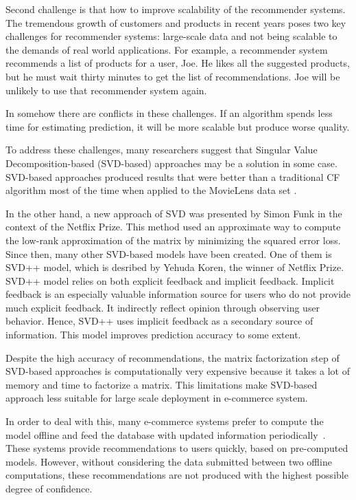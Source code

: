 \documentclass[oneside,13pt]{extreport}
\begin{document}
Second challenge is that how to improve scalability of the recommender systems. The tremendous growth of customers and products in recent years poses two key challenges for recommender systems: large-scale data and not being scalable to the demands of real world applications. For example, a recommender system recommends a list of products for a user, Joe. He likes all the suggested products, but he must wait thirty minutes to get the list of recommendations. Joe will be unlikely to use that recommender system again. 

In somehow there are conflicts in these challenges. If an algorithm spends less time for estimating prediction, it will be more scalable but produce worse quality. 

To address these challenges, many researchers suggest that Singular Value Decomposition-based (SVD-based) approaches may be a solution in some case. SVD-based approaches produced results that were better than a traditional CF algorithm most of the time when applied to the MovieLens data set \cite{SarwarApplication}. 

In the other hand, a new approach of SVD was presented by Simon Funk in the context of the Netflix Prize\cite{SimonFunk}. This method used an approximate way to compute the low-rank approximation of the matrix by minimizing the squared error loss. Since then, many other SVD-based models have been created. One of them is SVD++ model, which is desribed by Yehuda Koren, the winner of Netflix Prize. SVD++ model relies on both explicit feedback and implicit feedback\cite{BellKorFactor}. Implicit feedback is an especially valuable information source for users who do not provide much explicit feedback. It indirectly reflect opinion through observing user behavior. Hence, SVD++ uses implicit feedback as a secondary source of information. This model improves prediction accuracy to some extent.

Despite the high accuracy of recommendations, the matrix factorization step of SVD-based approaches is computationally very expensive because it takes a lot of memory and time to factorize a matrix. This limitations make SVD-based approach less suitable for large scale deployment in e-commerce system. 

In order to deal with this, many e-commerce systems prefer to compute the model offline and feed the database with updated information periodically~\cite{Linden}. These systems provide recommendations to users quickly, based on pre-computed models. However, without considering the data submitted between two offline computations, these recommendations  are not produced with the highest possible degree of confidence.
\end{document}
